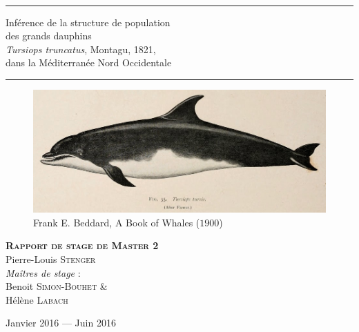 \documentclass[a4paper,12pt,twoside]{article}\usepackage[]{graphicx}\usepackage[]{color}
\begin{document}
\begin{titlepage}
\begin{sffamily}
\begin{center}
   \\[2cm]
   
      \rule[0.5ex]{\textwidth}{0.1mm}

    { \huge Inférence de la structure de population \\des grands dauphins \\
	\emph{Tursiops truncatus}, Montagu, 1821, \\
	dans la Méditerranée Nord Occidentale\\[0.4cm] }
	
   \rule[0.5ex]{\textwidth}{0.1mm}
   
   \begin{figure}[htbp]
   	\centering
   		\includegraphics[width=\textwidth]{tursiops}
   	\small{Frank E. Beddard, A Book of Whales ($1900$)}
   \end{figure}
   
    \textbf{\textsc{ Rapport de stage de Master 2}}\\[1cm]
	
\textrm{\Large{Pierre-Louis}} \textsc{\Large{Stenger}}\\[1cm]

        \emph{Maîtres de stage} : \\
		
		\textrm{\large{Benoit}} \textsc{\large{Simon-Bouhet}}
		\& \\
		\textrm{\large{Hélène}} \textsc{\large{Labach}}


    \vfill

    {\large Janvier 2016 — Juin 2016}

  \end{center}
  \end{sffamily}
\end{titlepage}


 \setcounter{page}{1} 
\end{document}
